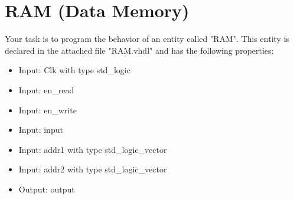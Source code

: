 \documentclass[a4paper,12pt]{article}
\begin{document}
\pagestyle{empty}
\setlength{\parindent}{0em} 
\section*{RAM (Data Memory)}

Your task is to program the behavior of an entity called "RAM". This entity is declared in the attached file "RAM.vhdl" and has the following properties:
\begin{itemize}
\item Input:  Clk with type std\_logic
\item Input:  en\_read%
\item Input:  en\_write%
\item Input:  input%
\item Input:  addr1 with type std\_logic\_vector
\item Input:  addr2 with type std\_logic\_vector
\item Output: output%
\end{itemize}
\end{document}
